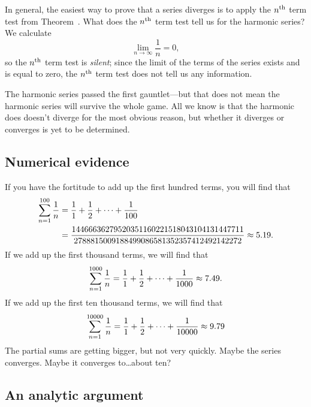 
In general, the easiest way to prove that a series diverges is to
apply the $n^{\mbox{\scriptsize th}}$ term test from Theorem~.
What does the $n^{\mbox{\scriptsize th}}$ term test tell us for the harmonic series?
We calculate
$$
\lim_{n \to \infty} \frac{1}{n} = 0,
$$
so the $n^{\mbox{\scriptsize th}}$ term test is \textit{silent}; since the limit of the
terms of the series exists and is equal to zero, the $n^{\mbox{\scriptsize th}}$ term
test does not tell us any information.

The harmonic series passed the first gauntlet---but that does not mean
the harmonic series will survive the whole game.  All we know is that
the harmonic does doesn't diverge for the most obvious reason, but
whether it diverges or converges is yet to be determined.

\subsection{Numerical evidence}

If you have the fortitude to add up the first hundred terms, you will find that
\begin{align*}
\sum_{n=1}^{100} {1\over n} &= \frac{1}{1} + \frac{1}{2} + \cdots + \frac{1}{100} \\
&= \frac{14466636279520351160221518043104131447711}{2788815009188499086581352357412492142272} \approx 5.19.
\end{align*}
If we add up the first thousand terms, we will find that
\begin{align*}
\sum_{n=1}^{1000} {1\over n} &= \frac{1}{1} + \frac{1}{2} + \cdots + \frac{1}{1000} \approx 7.49. \\
\end{align*}
If we add up the first ten thousand terms, we will find that
\begin{align*}
\sum_{n=1}^{10000} {1\over n} &= \frac{1}{1} + \frac{1}{2} + \cdots + \frac{1}{10000} \approx 9.79 \\
\end{align*}
The partial sums are getting bigger, but not very quickly.  Maybe the
series converges.  Maybe it converges to\ldots about ten?

\subsection{An analytic argument}


